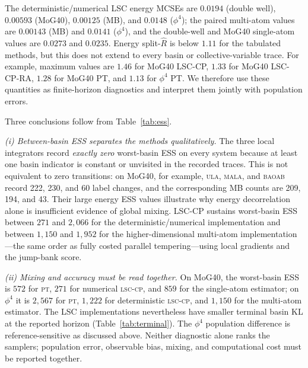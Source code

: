 \documentclass[11pt]{article}
\newcommand{\Rhat}{\widehat R}
\begin{document}
The deterministic/numerical LSC energy MCSEs are $0.0194$ (double well),
$0.00593$ (MoG40), $0.00125$ (MB), and $0.0148$ ($\phi^4$); the paired
multi-atom values are $0.00143$ (MB) and $0.0141$ ($\phi^4$), and the
double-well and MoG40 single-atom values are $0.0273$ and $0.0235$.
Energy split-$\Rhat$ is
below $1.11$ for the tabulated methods, but this does not extend to every
basin or collective-variable trace.  For example, maximum values are $1.46$
for MoG40 LSC-CP, $1.33$ for MoG40 LSC-CP-RA, $1.28$ for MoG40 PT, and $1.13$
for $\phi^4$ PT.  We therefore use these quantities as finite-horizon
diagnostics and interpret them jointly with population errors.

Three conclusions follow from Table~\ref{tab:ess}.

\emph{(i) Between-basin ESS separates the methods qualitatively.}
The three local integrators record \emph{exactly zero} worst-basin ESS on
every system because at least one basin indicator is constant or unvisited in
the recorded traces.  This is not equivalent to zero transitions: on MoG40,
for example, \textsc{ula}, \textsc{mala}, and \textsc{baoab} record 222, 230,
and 60 label changes, and the corresponding MB counts are 209, 194, and 43.
Their large energy ESS values illustrate why energy decorrelation alone is
insufficient evidence of global mixing.  LSC-CP sustains worst-basin ESS
between $271$ and $2{,}066$ for the deterministic/numerical implementation
and between $1{,}150$ and $1{,}952$ for the higher-dimensional multi-atom
implementation---the same order as fully costed parallel tempering---using
local gradients and the jump-bank score.

\emph{(ii) Mixing and accuracy must be read together.}
On MoG40, the worst-basin ESS is $572$ for \textsc{pt}, $271$ for numerical
\textsc{lsc-cp}, and $859$ for the single-atom estimator; on $\phi^4$ it is
$2{,}567$ for \textsc{pt}, $1{,}222$ for deterministic \textsc{lsc-cp}, and
$1{,}150$ for the multi-atom estimator.  The LSC implementations nevertheless
have smaller terminal basin KL at the reported horizon
(Table~\ref{tab:terminal}).  The $\phi^4$ population difference is
reference-sensitive as discussed above.  Neither diagnostic alone ranks the
samplers; population error, observable bias, mixing, and computational cost
must be reported together.
\end{document}
